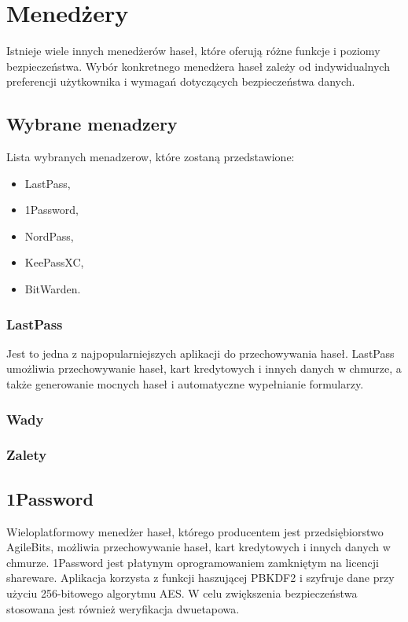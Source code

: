 \section{Menedżery}
Istnieje wiele innych menedżerów haseł, które oferują różne funkcje i poziomy bezpieczeństwa. Wybór konkretnego menedżera haseł zależy od indywidualnych preferencji użytkownika i wymagań dotyczących bezpieczeństwa danych.

\subsection{Wybrane menadzery}
Lista wybranych menadzerow, które zostaną przedstawione:
\begin{itemize}
    \item LastPass,
    \item 1Password,
    \item NordPass,
    \item KeePassXC,
    \item BitWarden.
\end{itemize}



\subsubsection{LastPass}

Jest to jedna z najpopularniejszych aplikacji do przechowywania haseł. LastPass umożliwia przechowywanie haseł, kart kredytowych i innych danych w chmurze, a także generowanie mocnych haseł i automatyczne wypełnianie formularzy.
\subsubsection{Wady}

\subsubsection{Zalety}

\subsection{1Password}
Wieloplatformowy menedżer haseł, którego producentem jest przedsiębiorstwo AgileBits, możliwia przechowywanie haseł, kart kredytowych i innych danych w chmurze. 1Password jest płatynym oprogramowaniem zamkniętym na licencji shareware. Aplikacja korzysta z funkcji haszującej PBKDF2 i szyfruje dane przy użyciu 256-bitowego algorytmu AES. W celu zwiększenia bezpieczeństwa stosowana jest również weryfikacja dwuetapowa.
